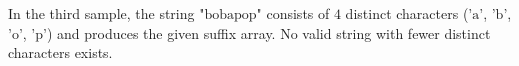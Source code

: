 In the third sample, the string $\text{"bobapop"}$ consists of $4$ distinct characters ($\text{'a'}$, $\text{'b'}$, $\text{'o'}$, $\text{'p'}$) and produces the given suffix array. 
No valid string with fewer distinct characters exists.
